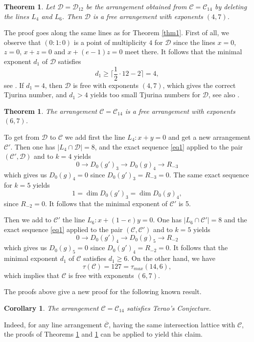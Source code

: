 \documentclass[12pt]{amsart}
\theoremstyle{plain}
\newtheorem{thm}[subsection]{Theorem}
\newtheorem{cor}[subsection]{Corollary}
\theoremstyle{definition}
\numberwithin{equation}{section}
\newcommand{\D}{{\mathcal D}}
\newcommand{\CC}{{\mathcal C}}
\begin{document}
 \begin{thm}
\label{thm10}
Let $\D=\D_{12}$ be the arrangement obtained from $\CC=\CC_{14}$ by deleting the lines $L_4$ and $L_6$. Then $\D$ is a free arrangement with exponents $(4,7)$.
\end{thm}
\proof
The proof goes along the same lines as for Theorem \ref{thm1}. First of all, we observe that $(0:1:0)$ is a point of multiplicity $4$ for $\D$ since the lines $x=0$, $z=0$, $x+z=0$ and $x+(e-1)z=0$ meet there. It follows that
the minimal exponent $d_1$ of $\D$ satisfies
$$d_1 \geq \bigg\lceil\frac{1}{2}\cdot 12 - 2 \bigg\rceil = 4,$$
see \cite[Theorem 2.8]{Mich}.
If $d_1=4$, then $ \D$ is free with exponents $(4,7)$, which gives the correct Tjurina number, and $d_1 >4$ yields too small Tjurina numbers for $\D$, see also \cite[Remark 5.4]{Der}.
\endproof

 \begin{thm}
\label{thm20}
The arrangement $\CC=\CC_{14}$ is a free arrangement with exponents~$(6,7)$.
\end{thm}
\proof
To get from $\D$ to $\CC$ we add first the line $L_4: x+y=0$ and get a new arrangement $\CC'$. Then one has $|L_4 \cap \D|=8$, and the exact sequence \eqref{eq1} applied to the pair $(\CC',\D)$ and to $k=4$ yields
$$0 \to D_0(g')_3 \to D_0(g)_4 \to R_{-3}$$
which gives us $D_0(g)_4=0$ since $D_0(g')_3=R_{-3}=0$.
The same exact sequence for $k=5$ yields
$$1= \dim D_0(g')_3 =\dim D_0(g)_4 ,$$
since $R_{-2}=0$. It follows that the minimal exponent of $\CC'$ is 5.

Then we add to $\CC'$ the line $L_6: x+(1-e)y=0$.  One has $|L_6 \cap \CC'|=8$ and the exact sequence \eqref{eq1} applied to the pair $(\CC,\CC')$ and to $k=5$ yields
$$0 \to D_0(g')_4 \to D_0(g)_5 \to R_{-2}$$
which gives us $D_0(g)_5=0$ since $D_0(g')_4=R_{-2}=0$. It follows that the minimal exponent $d_1$ of $\CC$ satisfies $d_1 \geq 6$. On the other hand, we have
$$\tau(\CC)=127= \tau_{max}(14,6),$$
which implies that $\CC$ is free with exponents $(6,7)$.

\endproof

The proofs above give a new proof for the following known result.

 \begin{cor}
\label{cor20}
The arrangement $\CC=\CC_{14}$ satisfies Terao's Conjecture.
\end{cor}
Indeed, for any line arrangement $\overline \CC$, having the same intersection lattice with $\CC$, the proofs of Theorems \ref{thm10} and \ref{thm20} can be applied to yield this claim.
\end{document}
